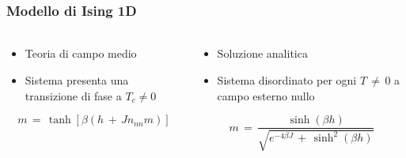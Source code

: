 \begin{frame}
    \frametitle{Modello di Ising 1D}
    \framesubtitle{}

    \begin{columns}

        \begin{column}{0.5\textwidth}
			
			\vspace{12pt}

			\begin{itemize}[itemsep=0.5em, label=$\diamond$]
                \item Teoria di campo medio
                \item Sistema presenta una transizione di fase a $T_c \neq 0$
            \end{itemize}

			\vspace{12pt}

			\begin{equation*}
				m\,=\,\tanh{\left[\beta\left(h\,+\,Jn_{nn}m\right)\right]}
				\label{eq: magn_Ising1D_MF}
			\end{equation*}

        \end{column}


        \begin{column}{0.5\textwidth}
			
			\vspace{12pt}

			\begin{itemize}[itemsep=0.5em, label=$\diamond$]
                \item Soluzione analitica
                \item Sistema disordinato per ogni $T\,\neq\,0$ a campo esterno nullo
            \end{itemize}

			\vspace{12pt}

			\begin{equation*}
				m\,=\,\frac{\sinh{\left(\beta h\right)}}{\sqrt{e^{-4\beta J}\,+\,\sinh^2{\left(\beta h\right)}}}
				\label{eq: magn_Ising1D_AS}
			\end{equation*}

        \end{column}
      \end{columns}
  
\end{frame}



